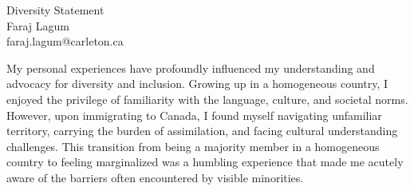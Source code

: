 \documentclass[11pt]{article}
\newcommand{\ignore}[1]{}
\begin{document}
\begin{center}
{\Large Diversity Statement} \\[.3in]
{\large Faraj Lagum}\\
faraj.lagum@carleton.ca \\

\ignore
{
\vspace*{.5in}
{``\emph{Education is not the learning of facts, but the training of minds to think.}'' \\ ---Albert Einstein.}
}

\end{center}









My personal experiences have profoundly influenced my understanding and advocacy for diversity and inclusion. Growing up in a homogeneous country, I enjoyed the privilege of familiarity with the language, culture, and societal norms. However, upon immigrating to Canada, I found myself navigating unfamiliar territory, carrying the burden of assimilation, and facing cultural understanding challenges. This transition from being a majority member in a homogeneous country to feeling marginalized was a humbling experience that made me acutely aware of the barriers often encountered by visible minorities.
\end{document}
